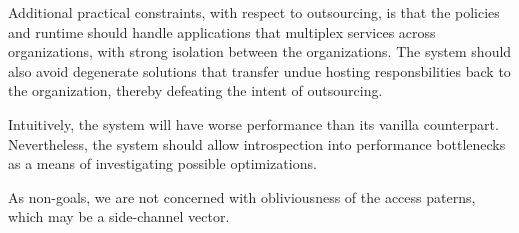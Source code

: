 Additional practical constraints, with respect to outsourcing, is that the policies
and runtime should handle applications that multiplex services across organizations,
with strong isolation between the organizations.
%
The system should also avoid degenerate solutions
that transfer undue hosting responsbilities back to the organization, thereby
defeating the intent of outsourcing.


Intuitively, the system will have worse performance than its vanilla
counterpart.
%
Nevertheless, the system should allow introspection into performance bottlenecks
as a means of investigating possible optimizations.


As non-goals, we are not concerned with obliviousness of the access paterns,
which may be a side-channel vector.
